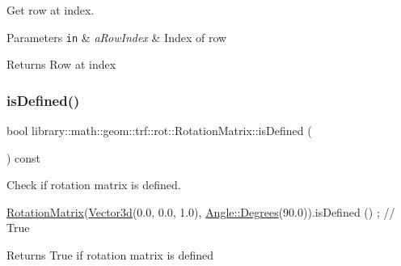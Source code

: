 Get row at index. 


\begin{DoxyParams}[1]{Parameters}
\mbox{\tt in}  & {\em a\+Row\+Index} & Index of row \\
\hline
\end{DoxyParams}
\begin{DoxyReturn}{Returns}
Row at index 
\end{DoxyReturn}
\mbox{\label{classlibrary_1_1math_1_1geom_1_1trf_1_1rot_1_1_rotation_matrix_aa5034776af47fc1eacb77359cef04550}} 
\subsubsection{\texorpdfstring{is\+Defined()}{isDefined()}}
{\footnotesize\ttfamily bool library\+::math\+::geom\+::trf\+::rot\+::\+Rotation\+Matrix\+::is\+Defined (\begin{DoxyParamCaption}{ }\end{DoxyParamCaption}) const}



Check if rotation matrix is defined. 


\begin{DoxyCode}
\hyperlink{classlibrary_1_1math_1_1geom_1_1trf_1_1rot_1_1_rotation_matrix_a667d2c05aa5b0cc88775938d11164cdc}{RotationMatrix}(\hyperlink{namespacelibrary_1_1math_1_1obj_a977e84e9bf317a4e7dd9d6d671d6da2f}{Vector3d}(0.0, 0.0, 1.0), \hyperlink{classlibrary_1_1math_1_1geom_1_1_angle_a64aa53e8420aeb6f671d86c65c370bc8}{Angle::Degrees}(90.0)).isDefined
      () ; \textcolor{comment}{// True}
\end{DoxyCode}


\begin{DoxyReturn}{Returns}
True if rotation matrix is defined 
\end{DoxyReturn}
\mbox{\label{classlibrary_1_1math_1_1geom_1_1trf_1_1rot_1_1_rotation_matrix_a28996f6b0def32867b58931e1c804b4f}} 
